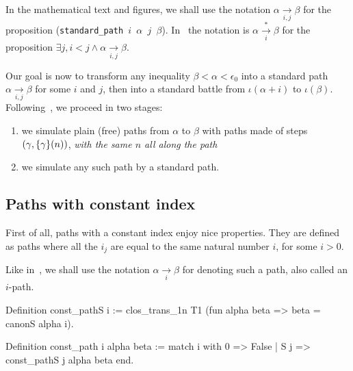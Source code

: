 \documentclass[a4paper]{book}
\begin{document}
In the mathematical text and figures, we shall use the notation 
$\alpha \xrightarrow[i,j]{}\beta$ for the proposition 
(\texttt{standard\_path $i$ $\alpha$ $j$ $\beta$}).
In~\cite{KS81} the notation is
$\alpha \xrightarrow[i]{*}\beta$
for 
the proposition  $\exists j, i<j \wedge \alpha \xrightarrow[i,j]{} \beta$.



Our goal is now  to transform any inequality $\beta<\alpha<\epsilon_0$ into a standard path $\alpha \xrightarrow[i,j]{} \beta$ for some $i$ and $j$, then into a standard battle
from $\iota(\alpha+i)$ to $\iota(\beta)$. 
Following~\cite{KS81}, we proceed in two stages:
\begin{enumerate}
\item we simulate plain (free) paths from $\alpha$ to $\beta$ with
paths made of steps $(\gamma,\mbox{$\{\gamma\}(n)$})$, \emph{with the same $n$ all along the path}
\item we simulate any such path by a standard path.
\end{enumerate}



\subsection{Paths with constant index}

First of all, paths with a constant index 
enjoy nice properties. They are defined as paths where all the $i_j$ are equal to the same natural number $i$, for some $i>0$. 


Like in~\cite{KS81}, we shall use the notation $\alpha \xrightarrow[i]{} \beta$ for denoting such a path, also called an $i$-path.

\begin{Coqsrc}
Definition const_pathS i :=
    clos_trans_1n T1 (fun alpha beta => beta = canonS alpha i).

Definition const_path i alpha beta :=
  match i with
    0 => False
  | S j => const_pathS j alpha beta
end.
\end{Coqsrc}


\end{document}
